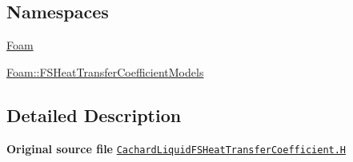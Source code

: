 \subsection*{Namespaces}
\begin{DoxyCompactItemize}
\item 
 \hyperlink{namespaceFoam}{Foam}
\item 
 \hyperlink{namespaceFoam_1_1FSHeatTransferCoefficientModels}{Foam\+::\+F\+S\+Heat\+Transfer\+Coefficient\+Models}
\end{DoxyCompactItemize}


\subsection{Detailed Description}
{\bfseries Original source file} \href{../../../home/carlo/data/GeN-Foam/GeN-Foam_ffn/GeN-Foam/GeN-Foam/classes/thermalHydraulics/src/physicsModels/heatTransferModels/FSHeatTransferCoefficientModels/subModels/postCHFModels/CachardLiquid/CachardLiquidFSHeatTransferCoefficient.H}{\tt Cachard\+Liquid\+F\+S\+Heat\+Transfer\+Coefficient.\+H} 